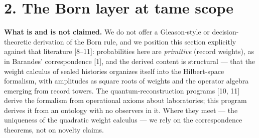 \documentclass[11pt]{article}
\begin{document}
\section*{2. The Born layer at tame scope}
\textbf{What is and is not claimed.}  We do not offer a Gleason-style or decision-theoretic derivation of the Born rule, and we position this section explicitly against that literature [8–11]: probabilities here are \emph{primitive} (record weights), as in Barandes' correspondence [1], and the derived content is structural — that the weight calculus of sealed histories organizes itself into the Hilbert-space formalism, with amplitudes as square roots of weights and the operator algebra emerging from record towers.  The quantum-reconstruction programs [10, 11] derive the formalism from operational axioms about laboratories; this program derives it from an ontology with no observers in it.  Where they meet — the uniqueness of the quadratic weight calculus — we rely on the correspondence theorems, not on novelty claims.
\end{document}
